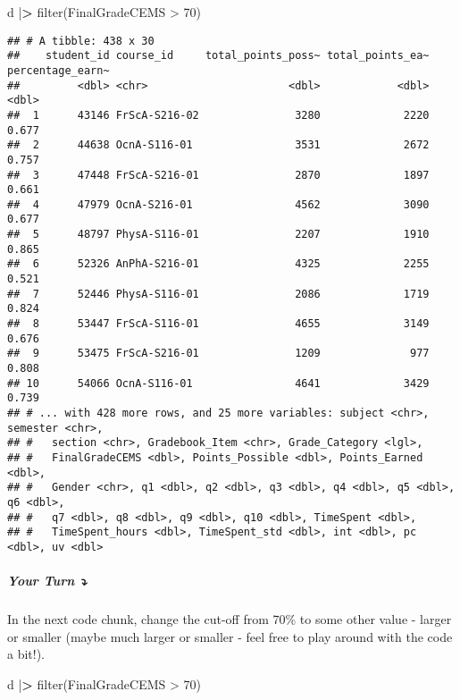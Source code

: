 \documentclass[
]{article}
\newenvironment{Shaded}{\begin{snugshade}}{\end{snugshade}}
\newcommand{\DecValTok}[1]{\textcolor[rgb]{0.00,0.00,0.81}{#1}}
\newcommand{\ErrorTok}[1]{\textcolor[rgb]{0.64,0.00,0.00}{\textbf{#1}}}
\newcommand{\FunctionTok}[1]{\textcolor[rgb]{0.00,0.00,0.00}{#1}}
\newcommand{\NormalTok}[1]{#1}
\newcommand{\SpecialCharTok}[1]{\textcolor[rgb]{0.00,0.00,0.00}{#1}}
\begin{document}
\begin{Shaded}
\begin{Highlighting}[]
\NormalTok{d }\SpecialCharTok{|}\ErrorTok{\textgreater{}} 
  \FunctionTok{filter}\NormalTok{(FinalGradeCEMS }\SpecialCharTok{\textgreater{}} \DecValTok{70}\NormalTok{)}
\end{Highlighting}
\end{Shaded}

\begin{verbatim}
## # A tibble: 438 x 30
##    student_id course_id     total_points_poss~ total_points_ea~ percentage_earn~
##         <dbl> <chr>                      <dbl>            <dbl>            <dbl>
##  1      43146 FrScA-S216-02               3280             2220            0.677
##  2      44638 OcnA-S116-01                3531             2672            0.757
##  3      47448 FrScA-S216-01               2870             1897            0.661
##  4      47979 OcnA-S216-01                4562             3090            0.677
##  5      48797 PhysA-S116-01               2207             1910            0.865
##  6      52326 AnPhA-S216-01               4325             2255            0.521
##  7      52446 PhysA-S116-01               2086             1719            0.824
##  8      53447 FrScA-S116-01               4655             3149            0.676
##  9      53475 FrScA-S216-01               1209              977            0.808
## 10      54066 OcnA-S116-01                4641             3429            0.739
## # ... with 428 more rows, and 25 more variables: subject <chr>, semester <chr>,
## #   section <chr>, Gradebook_Item <chr>, Grade_Category <lgl>,
## #   FinalGradeCEMS <dbl>, Points_Possible <dbl>, Points_Earned <dbl>,
## #   Gender <chr>, q1 <dbl>, q2 <dbl>, q3 <dbl>, q4 <dbl>, q5 <dbl>, q6 <dbl>,
## #   q7 <dbl>, q8 <dbl>, q9 <dbl>, q10 <dbl>, TimeSpent <dbl>,
## #   TimeSpent_hours <dbl>, TimeSpent_std <dbl>, int <dbl>, pc <dbl>, uv <dbl>
\end{verbatim}

\hypertarget{your-turn-3}{%
\subparagraph{\texorpdfstring{{\textbf{Your Turn}}
\textbf{⤵}}{Your Turn ⤵}}\label{your-turn-3}}

In the next code chunk, change the cut-off from 70\% to some other value
- larger or smaller (maybe much larger or smaller - feel free to play
around with the code a bit!).

\begin{Shaded}
\begin{Highlighting}[]
\NormalTok{d }\SpecialCharTok{|}\ErrorTok{\textgreater{}} 
  \FunctionTok{filter}\NormalTok{(FinalGradeCEMS }\SpecialCharTok{\textgreater{}} \DecValTok{70}\NormalTok{)}
\end{Highlighting}
\end{Shaded}
\end{document}
